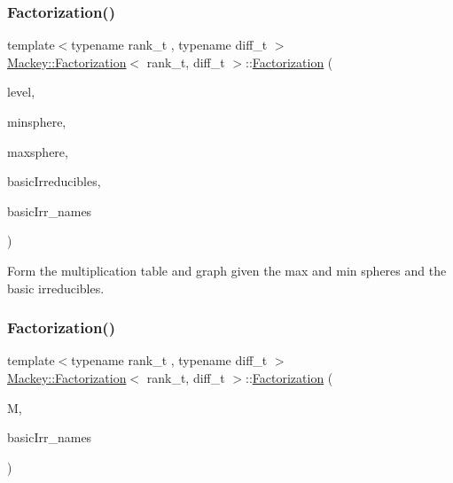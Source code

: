 \subsubsection{\texorpdfstring{Factorization()}{Factorization()}\hspace{0.1cm}{\footnotesize\ttfamily [1/2]}}
{\footnotesize\ttfamily template$<$typename rank\+\_\+t , typename diff\+\_\+t $>$ \\
\hyperlink{classMackey_1_1Factorization}{Mackey\+::\+Factorization}$<$ rank\+\_\+t, diff\+\_\+t $>$\+::\hyperlink{classMackey_1_1Factorization}{Factorization} (\begin{DoxyParamCaption}\item[{int}]{level,  }\item[{const std\+::vector$<$ int $>$ \&}]{minsphere,  }\item[{const std\+::vector$<$ int $>$ \&}]{maxsphere,  }\item[{const std\+::vector$<$ std\+::vector$<$ int $>$$>$ \&}]{basic\+Irreducibles,  }\item[{const std\+::vector$<$ std\+::string $>$ \&}]{basic\+Irr\+\_\+names }\end{DoxyParamCaption})}



Form the multiplication table and graph given the max and min spheres and the basic irreducibles. 

\mbox{\label{classMackey_1_1Factorization_a4d55bc1d6f94bdbcd365ed1bb0eaa2cb}} 
\subsubsection{\texorpdfstring{Factorization()}{Factorization()}\hspace{0.1cm}{\footnotesize\ttfamily [2/2]}}
{\footnotesize\ttfamily template$<$typename rank\+\_\+t , typename diff\+\_\+t $>$ \\
\hyperlink{classMackey_1_1Factorization}{Mackey\+::\+Factorization}$<$ rank\+\_\+t, diff\+\_\+t $>$\+::\hyperlink{classMackey_1_1Factorization}{Factorization} (\begin{DoxyParamCaption}\item[{\hyperlink{classMackey_1_1MultiplicationTable}{Multiplication\+Table}$<$ rank\+\_\+t, diff\+\_\+t $>$ \&}]{M,  }\item[{const std\+::vector$<$ std\+::string $>$ \&}]{basic\+Irr\+\_\+names }\end{DoxyParamCaption})\hspace{0.3cm}{\ttfamily [inline]}}



